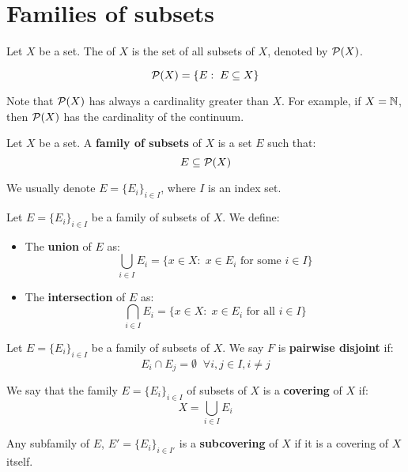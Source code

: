 \section{Families of subsets}

Let $X$ be a set. The  of $X$ is the set of all subsets of $X$,
denoted by $\mathcal{P}(X)$.

$$\mathcal{P}(X) = \{E: \; E \subseteq X\}$$

Note that $\mathcal{P}(X)$ has always a cardinality greater than $X$. For 
example, if $X = \mathbb{N}$, then $\mathcal{P}(X)$ has the cardinality of the continuum.

\begin{fdefinition}
    Let $X$ be a set. A \textbf{family of subsets} of $X$ is a set $E$
    such that:
    $$E \subseteq \mathcal{P}(X)$$

    We usually denote $E = \{E_i\}_{i \in I}$, where $I$ is an index set.
\end{fdefinition}

\begin{fdefinition}
    Let $E = \{E_i\}_{i \in I}$ be a family of subsets of $X$. We define:
    \begin{itemize}
        \item The \textbf{union} of $E$ as:
        $$\bigcup_{i \in I} E_i = \{x \in X: \; x \in E_i \text{ for some } i \in I\}$$

        \item The \textbf{intersection} of $E$ as:
        $$\bigcap_{i \in I} E_i = \{x \in X: \; x \in E_i \text{ for all } i \in I\}$$
    \end{itemize}
\end{fdefinition}

\begin{fdefinition}
    Let $E = \{E_i\}_{i \in I}$ be a family of subsets of $X$. We say $F$ is
    \textbf{pairwise disjoint} if:
    $$E_i \cap E_j = \emptyset \;\; \forall i, j \in I, i \neq j$$
\end{fdefinition}

\begin{fdefinition}
    We say that the family $E = \{E_i\}_{i \in I}$ of subsets of $X$ is a
    \textbf{covering} of $X$ if:
    $$X = \bigcup_{i \in I} E_i$$

    Any subfamily of $E$, $E' = \{E_i\}_{i \in I'}$ is a \textbf{subcovering}
    of $X$ if it is a covering of $X$ itself.
\end{fdefinition}


